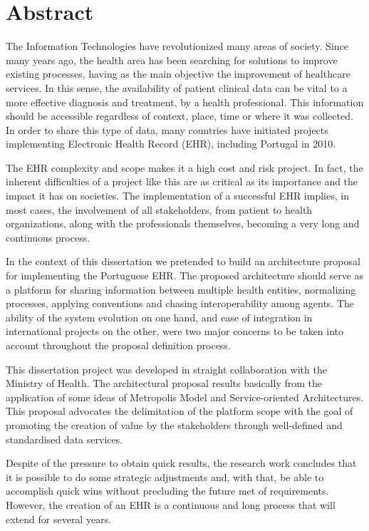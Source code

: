 \chapter*{Abstract}

The Information Technologies have revolutionized many areas of society. Since many years ago, the health area has been searching for solutions to improve existing processes, having as the main objective the improvement of healthcare services. In this sense, the availability of patient clinical data can be vital to a more effective diagnosis and treatment, by a health professional. This information should be accessible regardless of context, place, time or where it was collected. In order to share this type of data, many countries have initiated projects implementing Electronic Health Record (EHR), including Portugal in 2010.

The EHR complexity and scope makes it a high cost and risk project. In fact, the inherent difficulties of a project like this are as critical as its importance and the impact it has on societies. The implementation of a successful EHR implies, in most cases, the involvement of all stakeholders, from patient to health organizations, along with the professionals themselves, becoming a very long and continuous process.

In the context of this dissertation we pretended to build an architecture proposal for implementing the Portuguese EHR. The proposed architecture should serve as a platform for sharing information between multiple health entities, normalizing processes, applying conventions and chasing interoperability among agents. The ability of the system evolution on one hand, and ease of integration in international projects on the other, were two major concerns to be taken into account throughout the proposal definition process.

This dissertation project was developed in straight collaboration with the Ministry of Health. The architectural proposal results basically from the application of some ideas of Metropolis Model and Service-oriented Architectures. This proposal advocates the delimitation of the platform scope with the goal of promoting the creation of value by the stakeholders through well-defined and standardised data services.

Despite of the pressure to obtain quick results, the research work concludes that it is possible to do some strategic adjustments and, with that, be able to accomplish quick wins without precluding the future met of requirements. However, the creation of an EHR is a continuous and long process that will extend for several years.

